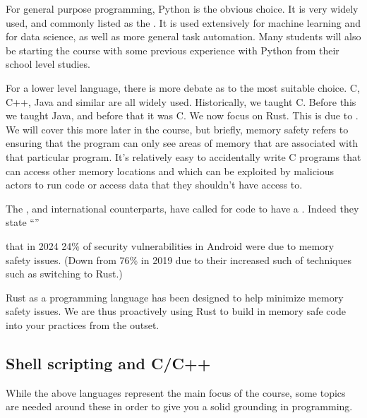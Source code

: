 \documentclass[letterpaper,10pt,british]{sphinxmanual}
\begin{document}
\sphinxAtStartPar
For general purpose programming, Python is the obvious choice. It is very widely used, and commonly listed as the . It is used extensively for machine learning and for data science, as well as more general task automation. Many students will also be starting the course with some previous experience with Python from their school level studies.

\sphinxAtStartPar
For a lower level language, there is more debate as to the most suitable choice. C, C++, Java and similar are all widely used. Historically, we taught C. Before this we taught Java, and before that it was C. We now focus on Rust. This is due to . We will cover this more later in the course, but briefly, memory safety refers to ensuring that the program can only see areas of memory that are associated with that particular program. It’s relatively easy to accidentally write C programs that can access other memory locations and which can be exploited by malicious actors to run code or access data that they shouldn’t have access to.

\sphinxAtStartPar
The , and international counterparts, have called for code to have a . Indeed they state “”

\sphinxAtStartPar
{} that in 2024 24\% of security vulnerabilities in Android were due to memory safety issues. (Down from 76\% in 2019 due to their increased such of techniques such as switching to Rust.)

\sphinxAtStartPar
Rust as a programming language has been designed to help minimize memory safety issues. We are thus proactively using Rust to build in memory safe code into your practices from the outset.


\subsection{Shell scripting and C/C++}
\label{\detokenize{chapters/motivation/our_choices:shell-scripting-and-c-c}}
\sphinxAtStartPar
While the above languages represent the main focus of the course, some topics are needed around these in order to give you a solid grounding in programming.
\end{document}

